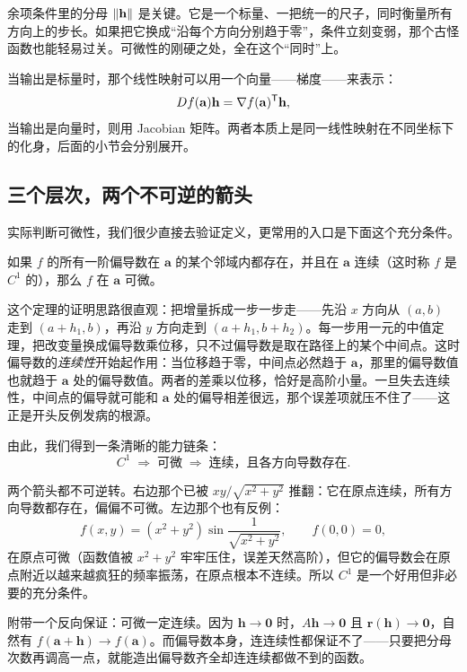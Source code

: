 余项条件里的分母 \(\left\lVert\mathbf h\right\rVert\) 是关键。它是一个标量、一把统一的尺子，同时衡量所有方向上的步长。如果把它换成``沿每个方向分别趋于零''，条件立刻变弱，那个古怪函数也能轻易过关。可微性的刚硬之处，全在这个``同时''上。

当输出是标量时，那个线性映射可以用一个向量——梯度——来表示：
\[
Df(\mathbf a)\mathbf h=\nabla f(\mathbf a)^{\mathsf{T}}\mathbf h,
\]
当输出是向量时，则用 Jacobian 矩阵。两者本质上是同一线性映射在不同坐标下的化身，后面的小节会分别展开。

\subsection{三个层次，两个不可逆的箭头}

实际判断可微性，我们很少直接去验证定义，更常用的入口是下面这个充分条件。

\begin{theorem}
如果 \(f\) 的所有一阶偏导数在 \(\mathbf a\) 的某个邻域内都存在，并且在 \(\mathbf a\) 连续（这时称 \(f\) 是 \(C^1\) 的），那么 \(f\) 在 \(\mathbf a\) 可微。
\end{theorem}

这个定理的证明思路很直观：把增量拆成一步一步走——先沿 \(x\) 方向从 \((a,b)\) 走到 \((a+h_1,b)\)，再沿 \(y\) 方向走到 \((a+h_1,b+h_2)\)。每一步用一元的中值定理，把改变量换成偏导数乘位移，只不过偏导数是取在路径上的某个中间点。这时偏导数的\emph{连续性}开始起作用：当位移趋于零，中间点必然趋于 \(\mathbf a\)，那里的偏导数值也就趋于 \(\mathbf a\) 处的偏导数值。两者的差乘以位移，恰好是高阶小量。一旦失去连续性，中间点的偏导就可能和 \(\mathbf a\) 处的偏导相差很远，那个误差项就压不住了——这正是开头反例发病的根源。

由此，我们得到一条清晰的能力链条：
\[
C^1\;\Longrightarrow\;\text{可微}\;\Longrightarrow\;\text{连续，且各方向导数存在}.
\]

两个箭头都不可逆转。右边那个已被 \(xy/\sqrt{x^2+y^2}\) 推翻：它在原点连续，所有方向导数都存在，偏偏不可微。左边那个也有反例：
\[
f(x,y)=(x^2+y^2)\sin\frac{1}{\sqrt{x^2+y^2}},\qquad f(0,0)=0,
\]
在原点可微（函数值被 \(x^2+y^2\) 牢牢压住，误差天然高阶），但它的偏导数会在原点附近以越来越疯狂的频率振荡，在原点根本不连续。所以 \(C^1\) 是一个好用但非必要的充分条件。

附带一个反向保证：可微一定连续。因为 \(\mathbf h\to\mathbf 0\) 时，\(A\mathbf h\to\mathbf 0\) 且 \(\mathbf r(\mathbf h)\to\mathbf 0\)，自然有 \(f(\mathbf a+\mathbf h)\to f(\mathbf a)\)。而偏导数本身，连连续性都保证不了——只要把分母次数再调高一点，就能造出偏导数齐全却连连续都做不到的函数。

